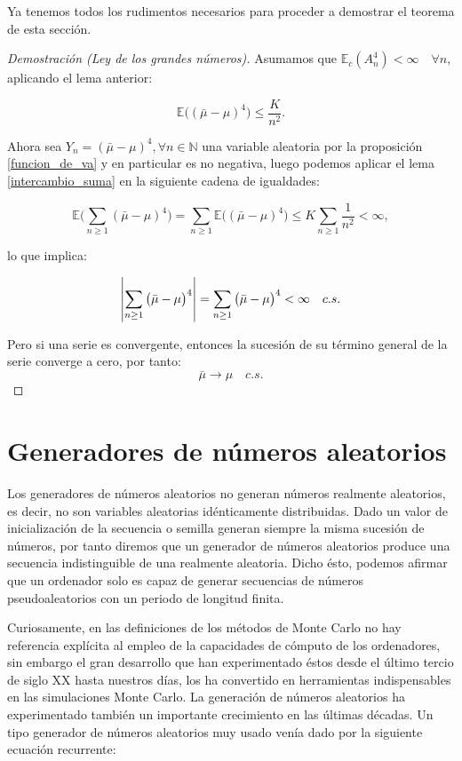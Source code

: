 \documentclass[../proyecto.tex]{memoir}
\begin{document}
Ya tenemos todos los rudimentos necesarios para proceder a demostrar el teorema de esta sección.

\begin{proof}[Demostración (Ley de los grandes números)]

Asumamos que $\mathds{E}_c( A_n^4) < \infty \quad \forall n$, aplicando el lema anterior:

$$
	\mathds{E} \big( ( \bar{ \mu } - \mu ) ^ 4 \big) \leq \frac{K}{n^{2}}.
$$

Ahora sea $Y_n = ( \bar{ \mu } - \mu ) ^ 4, \forall n \in \mathds{N}$ una variable aleatoria por la proposición \ref{funcion_de_va} y en particular es no negativa, luego podemos aplicar el lema \ref{intercambio_suma} en la siguiente cadena de igualdades:

$$
	\mathds{E} \big( \sum_{n \geq 1}( \bar{ \mu } - \mu ) ^ 4 \big) = \sum_{n \geq 1} \mathds{E} \big( ( \bar{ \mu } - \mu ) ^ 4 \big)  \leq K\sum_{n \geq 1}\frac{1}{n^{2}} < \infty,
$$

lo que implica:

$$
\abs{ \sum_{n \geq 1} \big( \bar{ \mu } - \mu \big)^ 4 } = \sum_{n \geq 1} \big( \bar{ \mu } - \mu \big)^ 4 < \infty \quad c.s. 
$$

Pero si una serie es convergente, entonces la sucesión de su término general de la serie converge a cero, por tanto:
$$
 \bar{ \mu } \to \mu \quad c.s.
$$
\end{proof}


\section{Generadores de números aleatorios}

Los generadores de números aleatorios no generan números realmente aleatorios, es decir, no son variables aleatorias idénticamente distribuidas. Dado un valor de inicialización de la secuencia o semilla generan siempre la misma sucesión de números, por tanto diremos que un generador de números aleatorios produce una secuencia indistinguible de una realmente aleatoria. Dicho ésto, podemos afirmar que un ordenador solo es capaz de generar secuencias de números pseudoaleatorios con un periodo de longitud finita.

Curiosamente, en las definiciones de los métodos de Monte Carlo no hay referencia explícita al empleo de la capacidades de cómputo de los ordenadores, sin embargo el gran desarrollo que han experimentado éstos desde el último tercio de siglo XX hasta nuestros días, los ha convertido en herramientas indispensables en las simulaciones Monte Carlo. La generación de números aleatorios ha experimentado también un importante crecimiento en las últimas décadas. Un tipo generador de números aleatorios muy usado venía dado por la siguiente ecuación recurrente:
\end{document}
